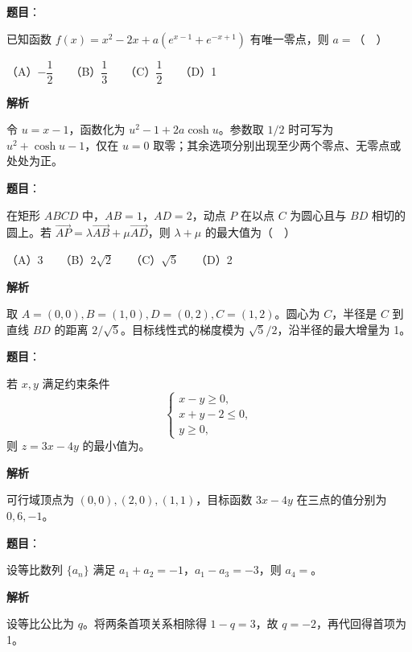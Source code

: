 \begin{answer}

\textbf{题目}：

已知函数 \(f(x)=x^2-2x+a\left(e^{x-1}+e^{-x+1}\right)\) 有唯一零点，则 \(a=\)（　）

   （A）\(-\dfrac12\)　　（B）\(\dfrac13\)　　（C）\(\dfrac12\)　　（D）1

\textbf{解析}

令 \(u=x-1\)，函数化为 \(u^2-1+2a\cosh u\)。参数取 \(1/2\) 时可写为 \(u^2+\cosh u-1\)，仅在 \(u=0\) 取零；其余选项分别出现至少两个零点、无零点或处处为正。


\end{answer}
\begin{answer}

\textbf{题目}：

在矩形 \(ABCD\) 中，\(AB=1\)，\(AD=2\)，动点 \(P\) 在以点 \(C\) 为圆心且与 \(BD\) 相切的圆上。若 \(\overrightarrow{AP}=\lambda\overrightarrow{AB}+\mu\overrightarrow{AD}\)，则 \(\lambda+\mu\) 的最大值为（　）

   （A）3　　（B）\(2\sqrt2\)　　（C）\(\sqrt5\)　　（D）2

\textbf{解析}

取 \(A=(0,0),B=(1,0),D=(0,2),C=(1,2)\)。圆心为 \(C\)，半径是 \(C\) 到直线 \(BD\) 的距离 \(2/\sqrt5\)。目标线性式的梯度模为 \(\sqrt5/2\)，沿半径的最大增量为 1。


\end{answer}
\begin{answer}

\textbf{题目}：

若 \(x,y\) 满足约束条件
\nopagebreak[4]
\[
\begin{cases}
x-y\ge 0,\\
x+y-2\le 0,\\
y\ge 0,
\end{cases}
\]
则 \(z=3x-4y\) 的最小值为\gkblank{}。

\textbf{解析}

可行域顶点为 \((0,0),(2,0),(1,1)\)，目标函数 \(3x-4y\) 在三点的值分别为 \(0,6,-1\)。


\end{answer}
\begin{answer}

\textbf{题目}：

设等比数列 \(\{a_n\}\) 满足 \(a_1+a_2=-1\)，\(a_1-a_3=-3\)，则 \(a_4=\)\gkblank{}。

\textbf{解析}

设等比公比为 \(q\)。将两条首项关系相除得 \(1-q=3\)，故 \(q=-2\)，再代回得首项为 1。


\end{answer}
